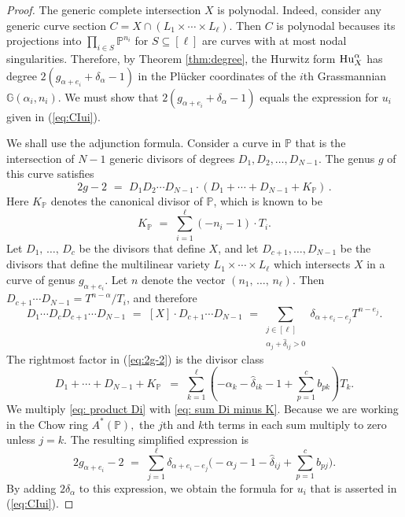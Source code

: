 \documentclass[12pt]{article}
\theoremstyle{definition}
\newcommand{\bG}{\mathbb G}
\newcommand{\bP}{\mathbb P}
\begin{document}
\begin{proof}
The generic complete intersection $X$ is polynodal. Indeed, 
consider any  generic curve section $C = X \cap (L_1 \times \cdots \times L_\ell)$.
Then $C$ is polynodal becauses its projections into $\prod_{i \in S} \bP^{n_i}$ for $S \subseteq [\ell]$
are curves with at most nodal singularities. Therefore,  by Theorem \ref{thm:degree}, the Hurwitz form
${\rm Hu}_X^\alpha$ has degree $2 (g_{\alpha+e_i}+\delta_\alpha - 1) $
in the Pl\"ucker coordinates of the $i$th Grassmannian
$\bG(\alpha_i,n_i)$. We must show that
$2 (g_{\alpha+e_i}+\delta_\alpha - 1) $ equals
the expression for $u_i$ given in (\ref{eq:CIui}).

We shall use the adjunction formula.
Consider a curve in $\bP$ that is the intersection of
$N-1$ generic divisors of degrees $D_1,D_2,\ldots,D_{N-1}$.
The genus $g$ of this curve satisfies
\begin{equation}
\label{eq:2g-2}
  2g -2 \,\,= \,\,D_1 D_2 \cdots D_{N-1} \cdot (D_1+\cdots+D_{N-1}+K_{\bP})\,. 
  \end{equation}
Here $K_\bP$ denotes the canonical divisor of $\bP $, which is known to be
$$ K_{\bP} \,\, = \,\, \sum_{i=1}^\ell (-n_i-1) \cdot T_i . $$
 Let $D_1, \, \ldots, \, D_c$ be the divisors that define $X$, and 
 let $D_{c+1},\ldots,D_{N-1}$ be the divisors that define
 the multilinear variety $L_1 \times\cdots \times L_\ell$ which intersects $X$
  in a curve of genus $g_{\alpha+e_i}$.
  Let $n$ denote the vector $(n_1, \, \ldots, \, n_\ell)$.
  Then $D_{c+1} \cdots D_{N-1} = T^{n-\alpha}/T_i$, and therefore
      \begin{equation}\label{eq: product Di}
        D_1 \cdots D_c D_{c+1}\cdots D_{N-1} \,\,=\,\,         [X] \cdot D_{c+1} \cdots D_{N-1} \,\,
         = \sum_{\substack{j\in[\ell]\\\alpha_j+\hat{\delta}_{ij}>0}} \delta_{\alpha + e_i - e_j}T^{n - e_j}.
    \end{equation}
The rightmost factor in (\ref{eq:2g-2}) is the divisor class
\begin{equation}\label{eq: sum Di minus K}
  D_1+\cdots+D_{N-1}+K_{\bP}\, \,\,= \,\,\sum_{k=1}^\ell\left(-\alpha_k-\hat{\delta}_{ik}-1+\sum_{p=1}^c b_{pk}\right)T_k.
 \end{equation}
    We multiply \eqref{eq: product Di} with \eqref{eq: sum Di minus K}. Because we are working in the Chow ring $A^*(\bP),$ the $j$th and $k$th terms in each sum multiply to zero unless $j=k.$ The 
    resulting simplified expression is
    $$
        2g_{\alpha + e_i} -2 \,\,= \,\,
        \sum_{j=1}^\ell \delta_{\alpha + e_i - e_j} \biggl(- \alpha_j - 1 - \hat{\delta}_{ij} + \sum_{p=1}^c b_{pj} \biggr).
$$
    By adding $2 \delta_\alpha$ to this expression, we obtain the
    formula for $u_i$ that is asserted in (\ref{eq:CIui}).
\end{proof}
\end{document}
